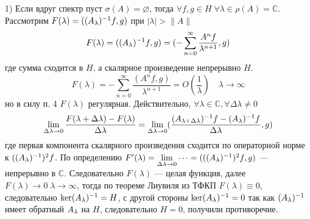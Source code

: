 \documentclass[14pt]{extarticle}
\begin{document}
\begin{Proof}
    1) Если вдруг спектр пуст $\sigma(A) = \varnothing$, тогда $\forall f, g \in H\;\forall \lambda \in  \rho(A) = \mathbb C$.
    Рассмотрим $F(\lambda) = ((A_\lambda)^{-1} f, g)$ при $|\lambda| > \|A\|$
    $$
    F(\lambda) = ((A_\lambda)^{-1} f, g) = (-\sum_{n = 0}^{\infty}
    \dfrac{A^n f}{\lambda^{n + 1}}, g)
    $$
    где сумма сходится в $H$, а скалярное произведение непрерывно $H$.
    $$
    F(\lambda) = -\sum_{n = 0}^{\infty} \dfrac{(A^n f, g)}{\lambda^{n + 1}} = O(\dfrac{1}{\lambda}) \quad \lambda \to \infty
    $$
    но в силу п. 4 $F(\lambda)$ регулярная.
    Действительно, $\forall \lambda \in \mathbb C, \forall \Delta\lambda \ne 0$
    $$
    \lim\limits_{\Delta\lambda \to 0} \dfrac{F(\lambda + \Delta\lambda) - F(\lambda)}
    {\Delta\lambda} = \lim\limits_{\Delta\lambda \to 0} (\dfrac{(A_{\lambda + \Delta\lambda})^{-1}f - (A_\lambda)^{-1} f}{\Delta\lambda}, g)
    $$
    где первая компонента скалярного произведения сходится по операторной норме к $((A_\lambda)^{-1})^2f$.
    По определению $F'(\lambda) = \lim\limits_{\Delta\lambda \to 0} \dots = (((A_\lambda)^{-1})^2 f, g)$ --- непрерывно в $\mathbb C$.
    Следовательно $F(\lambda)$ --- целая функция, далее $F(\lambda) \to 0\;\lambda \to \infty$, тогда по теореме Лиувиля из ТФКП $F(\lambda) \equiv 0$,
    следовательно $\ker (A_\lambda)^{-1} = H$, с другой стороны $\ker (A_\lambda)^{-1} = 0$ так как $(A_\lambda)^{-1}$ имеет обратный $\Al$ на $H$, следовательно $H = 0$, получили противоречие.
    

\end{Proof}
\end{document}
